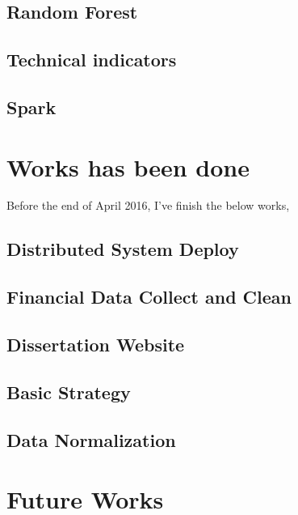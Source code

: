 \documentclass[12pt,a4paper]{scrartcl}
\begin{document}
	\subsection{Random Forest}
	\subsection{Technical indicators}
	\subsection{Spark}
	\section{Works has been done}
	Before the end of April 2016, I've finish the below works,
	\subsection{Distributed System Deploy}
	\subsection{Financial Data Collect and Clean}
	\subsection{Dissertation Website}
	\subsection{Basic Strategy}
	\subsection{Data Normalization}
	\section{Future Works}
	
\end{document}
